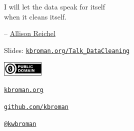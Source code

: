 \documentclass[aspectratio=169,12pt,t]{beamer}
\begin{document}
\begin{frame}[c]{}

\centering
\Large

I will let the data speak for itself \\[3pt]
when it cleans itself.

\bigskip\bigskip

\hspace{5cm} --
\href{https://twitter.com/AllisonReichel}{Allison Reichel}



\end{frame}



\begin{frame}[c]{}

\Large

Slides: \href{https://kbroman.org/Talk_DataCleaning}{\tt kbroman.org/Talk\_DataCleaning}

\vspace*{-7mm}
\hfill
\href{https://creativecommons.org/publicdomain/zero/1.0/}{\includegraphics[height=7mm]{Figs/cc-zero.png}}

\vspace{5mm}

\href{https://kbroman.org}{\tt \lolit kbroman.org}

\vspace{7mm}

\href{https://github.com/kbroman}{\tt \lolit github.com/kbroman}

\vspace{7mm}

\href{https://twitter.com/kwbroman}{\tt \lolit @kwbroman}


\end{frame}
\end{document}
